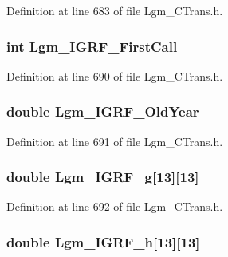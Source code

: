Definition at line 683 of file Lgm\_\-CTrans.h.\hypertarget{struct_lgm___c_trans_4ed10c5333f6674ca1574d00c56ae3da}{
\subsubsection[{Lgm\_\-IGRF\_\-FirstCall}]{\setlength{\rightskip}{0pt plus 5cm}int {\bf Lgm\_\-IGRF\_\-FirstCall}}}
\label{struct_lgm___c_trans_4ed10c5333f6674ca1574d00c56ae3da}




Definition at line 690 of file Lgm\_\-CTrans.h.\hypertarget{struct_lgm___c_trans_fecd660b4543de5ef4d7313ab481d28c}{
\subsubsection[{Lgm\_\-IGRF\_\-OldYear}]{\setlength{\rightskip}{0pt plus 5cm}double {\bf Lgm\_\-IGRF\_\-OldYear}}}
\label{struct_lgm___c_trans_fecd660b4543de5ef4d7313ab481d28c}




Definition at line 691 of file Lgm\_\-CTrans.h.\hypertarget{struct_lgm___c_trans_2f34dac1bc690a7daee26931f3035a4b}{
\subsubsection[{Lgm\_\-IGRF\_\-g}]{\setlength{\rightskip}{0pt plus 5cm}double {\bf Lgm\_\-IGRF\_\-g}\mbox{[}13\mbox{]}\mbox{[}13\mbox{]}}}
\label{struct_lgm___c_trans_2f34dac1bc690a7daee26931f3035a4b}




Definition at line 692 of file Lgm\_\-CTrans.h.\hypertarget{struct_lgm___c_trans_fcef05c35f42f86c066479ae8ebef3a4}{
\subsubsection[{Lgm\_\-IGRF\_\-h}]{\setlength{\rightskip}{0pt plus 5cm}double {\bf Lgm\_\-IGRF\_\-h}\mbox{[}13\mbox{]}\mbox{[}13\mbox{]}}}
\label{struct_lgm___c_trans_fcef05c35f42f86c066479ae8ebef3a4}




